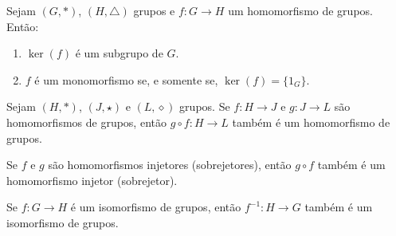 \documentclass{beamer}
\begin{document}
    \begin{frame}
        \begin{proposicao}
            Sejam $(G, \ast )$, \pause $(H, \triangle)$ grupos \pause e $f : G \to H$ um homomorfismo de grupos. \pause Então: \pause
            \vspace{.5cm}

            \begin{enumerate}[label={\roman*})]
                \item $\ker(f)$ é um subgrupo de $G$. \pause

                \vspace{.5cm}

                \item $f$ é um monomorfismo se, e somente se, $\ker(f) = \{1_G\}$.

                \vspace{.5cm}
            \end{enumerate}
        \end{proposicao}
    \end{frame}

    \begin{frame}
        \begin{proposicao}
            Sejam $(H, \ast )$, $(J, \star)$ e $(L, \diamond)$ grupos. \pause Se $f : H \to J$ \pause e $g : J \to L$ \pause são homomorfismos de grupos, \pause então $g \circ f : H \to L$ \pause também é um homomorfismo de grupos.
        \end{proposicao}
        \vspace{2cm}
    \end{frame}

    \begin{frame}
        \begin{corolario}
            Se $f$ e $g$ são homomorfismos \pause injetores \pause (sobrejetores), então $g \circ f$ \pause também é um homomorfismo injetor \pause (sobrejetor).
        \end{corolario}
        \vspace{2cm}
    \end{frame}

    \begin{frame}
        \begin{proposicao}
            Se $f : G \to H$ é um isomorfismo de grupos, \pause então $f^{-1} : H \to G$ \pause também é um isomorfismo de grupos.
        \end{proposicao}
    \end{frame}
\end{document}
